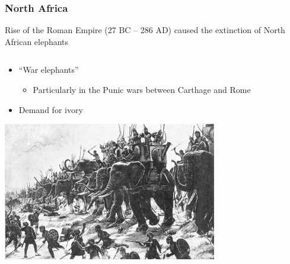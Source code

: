 \documentclass[10pt]{beamer}
\begin{document}
\begin{frame}[t]
\frametitle{North Africa}
\vspace{0.5cm}
		
	Rise of the Roman Empire (27 BC -- 286 AD) caused the extinction of North African elephants\\
	
	\vspace{0.25cm}
	
	 \begin{columns}
		\begin{column}{0.6\textwidth}
			\begin{itemize}
				\item ``War elephants''
					\begin{itemize}
						\item Particularly in the Punic wars between Carthage and Rome
					\end{itemize}
				\medskip	
				\item Demand for ivory
			\end{itemize}
			
			\medskip
			
			\begin{center}
				\includegraphics[width=0.7\textwidth]{figures/war_elephants.jpg}
			\end{center}
		\end{column}
		

\end{columns}
\end{frame}
\end{document}
